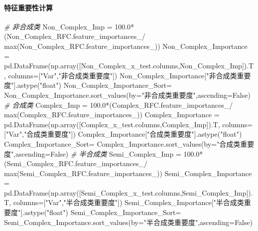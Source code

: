 \documentclass[
]{article}
\newenvironment{Shaded}{}{}
\newcommand{\BuiltInTok}[1]{#1}
\newcommand{\CommentTok}[1]{\textcolor[rgb]{0.38,0.63,0.69}{\textit{#1}}}
\newcommand{\FloatTok}[1]{\textcolor[rgb]{0.25,0.63,0.44}{#1}}
\newcommand{\NormalTok}[1]{#1}
\newcommand{\OperatorTok}[1]{\textcolor[rgb]{0.40,0.40,0.40}{#1}}
\newcommand{\StringTok}[1]{\textcolor[rgb]{0.25,0.44,0.63}{#1}}
\newcommand{\VariableTok}[1]{\textcolor[rgb]{0.10,0.09,0.49}{#1}}
\begin{document}
\hypertarget{header-n306}{%
\paragraph{特征重要性计算}\label{header-n306}}

\begin{Shaded}
\begin{Highlighting}[]
\CommentTok{\# 非合成类}
\NormalTok{Non\_Complex\_Imp }\OperatorTok{=} \FloatTok{100.0}\OperatorTok{*}\NormalTok{(Non\_Complex\_RFC.feature\_importances\_}\OperatorTok{/}
                             \BuiltInTok{max}\NormalTok{(Non\_Complex\_RFC.feature\_importances\_))}
\NormalTok{Non\_Complex\_Importance }\OperatorTok{=}\NormalTok{ pd.DataFrame(np.array([Non\_Complex\_x\_test.columns,Non\_Complex\_Imp]).T,}
\NormalTok{                                      columns}\OperatorTok{=}\NormalTok{[}\StringTok{"Var"}\NormalTok{,}\StringTok{"非合成类重要度"}\NormalTok{])}
\NormalTok{Non\_Complex\_Importance[}\StringTok{"非合成类重要度"}\NormalTok{].astype(}\StringTok{"float"}\NormalTok{)}
\NormalTok{Non\_Complex\_Importance\_Sort}\OperatorTok{=}\NormalTok{ Non\_Complex\_Importance.sort\_values(by}\OperatorTok{=}\StringTok{"非合成类重要度"}\NormalTok{,ascending}\OperatorTok{=}\VariableTok{False}\NormalTok{)}
\CommentTok{\# 合成类}
\NormalTok{Complex\_Imp }\OperatorTok{=} \FloatTok{100.0}\OperatorTok{*}\NormalTok{(Complex\_RFC.feature\_importances\_}\OperatorTok{/}
                             \BuiltInTok{max}\NormalTok{(Complex\_RFC.feature\_importances\_))}
\NormalTok{Complex\_Importance }\OperatorTok{=}\NormalTok{ pd.DataFrame(np.array([Complex\_x\_test.columns,Complex\_Imp]).T,}
\NormalTok{                                  columns}\OperatorTok{=}\NormalTok{[}\StringTok{"Var"}\NormalTok{,}\StringTok{"合成类重要度"}\NormalTok{])}
\NormalTok{Complex\_Importance[}\StringTok{"合成类重要度"}\NormalTok{].astype(}\StringTok{"float"}\NormalTok{)}
\NormalTok{Complex\_Importance\_Sort}\OperatorTok{=}\NormalTok{ Complex\_Importance.sort\_values(by}\OperatorTok{=}\StringTok{"合成类重要度"}\NormalTok{,ascending}\OperatorTok{=}\VariableTok{False}\NormalTok{)}
\CommentTok{\# 半合成类}
\NormalTok{Semi\_Complex\_Imp }\OperatorTok{=} \FloatTok{100.0}\OperatorTok{*}\NormalTok{(Semi\_Complex\_RFC.feature\_importances\_}\OperatorTok{/}
                             \BuiltInTok{max}\NormalTok{(Semi\_Complex\_RFC.feature\_importances\_))}
\NormalTok{Semi\_Complex\_Importance }\OperatorTok{=}\NormalTok{ pd.DataFrame(np.array([Semi\_Complex\_x\_test.columns,Semi\_Complex\_Imp]).T,}
\NormalTok{                                           columns}\OperatorTok{=}\NormalTok{[}\StringTok{"Var"}\NormalTok{,}\StringTok{"半合成类重要度"}\NormalTok{])}
\NormalTok{Semi\_Complex\_Importance[}\StringTok{"半合成类重要度"}\NormalTok{].astype(}\StringTok{"float"}\NormalTok{)}
\NormalTok{Semi\_Complex\_Importance\_Sort}\OperatorTok{=}\NormalTok{ Semi\_Complex\_Importance.sort\_values(by}\OperatorTok{=}\StringTok{"半合成类重要度"}\NormalTok{,ascending}\OperatorTok{=}\VariableTok{False}\NormalTok{)}
\end{Highlighting}
\end{Shaded}
\end{document}
